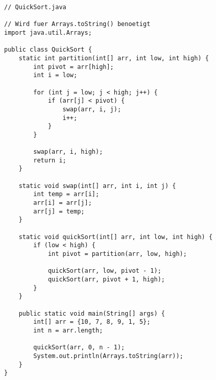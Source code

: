 \begin{center}
\begin{lstlisting}
// QuickSort.java

// Wird fuer Arrays.toString() benoetigt
import java.util.Arrays;

public class QuickSort {
    static int partition(int[] arr, int low, int high) {
        int pivot = arr[high];
        int i = low;

        for (int j = low; j < high; j++) {
            if (arr[j] < pivot) {
                swap(arr, i, j);
                i++;
            }
        }

        swap(arr, i, high);  
        return i;
    }

    static void swap(int[] arr, int i, int j) {
        int temp = arr[i];
        arr[i] = arr[j];
        arr[j] = temp;
    }

    static void quickSort(int[] arr, int low, int high) {
        if (low < high) {          
            int pivot = partition(arr, low, high);

            quickSort(arr, low, pivot - 1);
            quickSort(arr, pivot + 1, high);
        }
    }

    public static void main(String[] args) {
        int[] arr = {10, 7, 8, 9, 1, 5};
        int n = arr.length;
      
        quickSort(arr, 0, n - 1);
        System.out.println(Arrays.toString(arr));
    }
}
\end{lstlisting}
\end{center}
